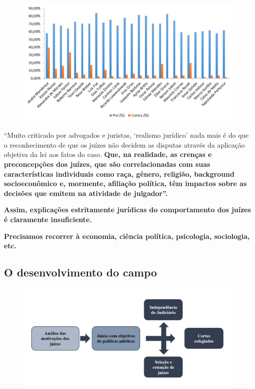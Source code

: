 \documentclass[a4paper,12pt]{article}[abntex2]
\begin{document}
\begin{figure}[H]
    \centering
    \includegraphics[width=0.7\linewidth]{Imagens/a13i5.png}
\end{figure}

“Muito criticado por advogados e juristas, ‘realismo jurídico’ nada mais é do que o reconhecimento de que os juízes não decidem as disputas através da aplicação objetiva da lei aos fatos do caso. \textbf{Que, na realidade, as crenças e preconcepções dos juízes, que são correlacionadas com suas características individuais como raça, gênero, religião, background socioeconômico e, mormente, afiliação política, têm impactos sobre as decisões que emitem na atividade de julgador”.  }

\textbf{Assim, explicações estritamente jurídicas do comportamento dos juízes é claramente insuficiente.}

\textbf{Precisamos recorrer à economia, ciência política, psicologia, sociologia, etc.}

\subsection{\textbf{O desenvolvimento do campo}}
\begin{figure}[H]
    \centering
    \includegraphics[width=0.7\linewidth]{Imagens/a13i6.png}
\end{figure}
\end{document}
